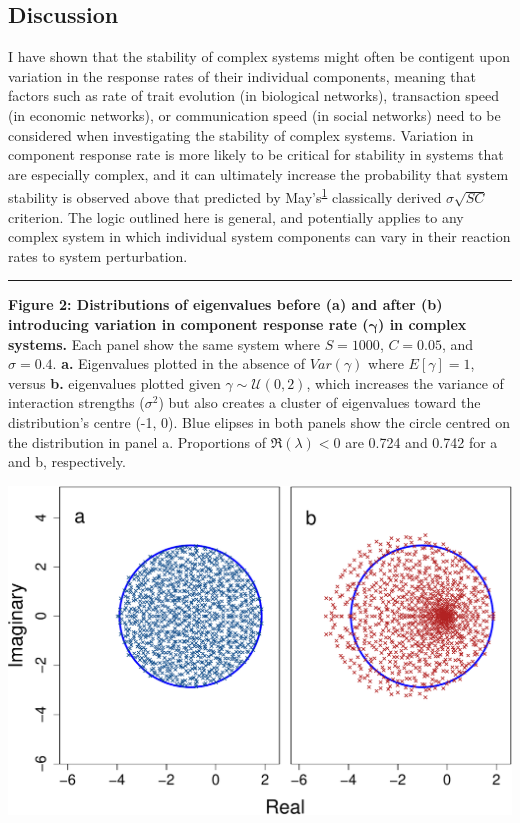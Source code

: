 \documentclass[]{article}
\begin{document}
\subsection{Discussion}\label{discussion}

I have shown that the stability of complex systems might often be
contigent upon variation in the response rates of their individual
components, meaning that factors such as rate of trait evolution (in
biological networks), transaction speed (in economic networks), or
communication speed (in social networks) need to be considered when
investigating the stability of complex systems. Variation in component
response rate is more likely to be critical for stability in systems
that are especially complex, and it can ultimately increase the
probability that system stability is observed above that predicted by
May's\textsuperscript{\protect\hyperlink{ref-May1972}{1}} classically
derived \(\sigma \sqrt{SC}\) criterion. The logic outlined here is
general, and potentially applies to any complex system in which
individual system components can vary in their reaction rates to system
perturbation.

\begin{center}\rule{0.5\linewidth}{\linethickness}\end{center}

\textbf{Figure 2: Distributions of eigenvalues before (a) and after (b)
introducing variation in component response rate
(\(\boldsymbol{\gamma}\)) in complex systems.} Each panel show the same
system where \(S = 1000\), \(C = 0.05\), and \(\sigma = 0.4\).
\textbf{a.} Eigenvalues plotted in the absence of \(Var(\gamma)\) where
\(E[\gamma] = 1\), versus \textbf{b.} eigenvalues plotted given
\(\gamma \sim \mathcal{U}(0, 2)\), which increases the variance of
interaction strengths (\(\sigma^{2}\)) but also creates a cluster of
eigenvalues toward the distribution's centre (-1, 0). Blue elipses in
both panels show the circle centred on the distribution in panel a.
Proportions of \(\Re(\lambda) < 0\) are 0.724 and 0.742 for a and b,
respectively.

\includegraphics{unnamed-chunk-13-1.pdf}
\end{document}
